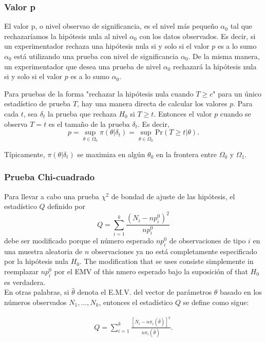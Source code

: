 \documentclass{book}
\begin{document}
\subsubsection{Valor p}
El valor p, o nivel observao de significancia, es el nivel más pequeño $\alpha_0$ tal que rechazaríamos la hipótesis nula al nivel $\alpha_0$ con los datos observados. Es decir, si un experimentador rechaza una hipótesis nula si y solo si el valor $p$ es a lo sumo $\alpha_0$ está utilizando una prueba con nivel de significancia $\alpha_0$. De la misma manera, un experimentador que desea una prueba de nivel $\alpha_0$ rechazará la hipótesis nula si y solo si el valor $p$ es a lo sumo $\alpha_0$.

Para pruebas de la forma "rechazar la hipótesis nula cuando $T \geq c$" para un único estadístico de prueba $T$, hay una manera directa de calcular los valores $p$. 
Para cada $t$, sea $\delta_t$ la prueba que rechaza $H_0$ si $T \geq t$. Entonces el valor $p$ cuando se observa $T = t$ es el tamaño de la prueba $\delta_t$.
Es decir,
\begin{equation}
p = \sup_{\theta \in \Omega_0} \pi(\theta|\delta_t) = \sup_{\theta \in \Omega_0} \text{Pr}(T \geq t|\theta).
\end{equation}

Típicamente, $\pi(\theta|\delta_t)$ se maximiza en algún $\theta_0$ en la frontera entre $\Omega_0$ y $\Omega_1$.


\subsubsection{Prueba Chi-cuadrado}
Para llevar a cabo una prueba $\chi^2$ de bondad de ajuste de las hipótesis, el estadístico $Q$ definido por 
$$Q = \sum_{i=1}^{k} \frac{(N_i - np_i^0)^2}{np_i^0}$$
debe ser modificado porque el número esperado $np_i^0$ de observaciones de tipo $i$ en una muestra aleatoria de $n$ observaciones ya no está completamente especificado por la hipótesis nula $H_0$. The modification that se uses consiste simplemente in reemplazar $np_i^0$ por el EMV of this nmero esperado bajo la suposición of that $H_0$ es verdadera.\\
En otras palabras, si $\hat{\theta}$ denota el E.M.V. del vector de parámetros $\theta$ basado en los números observados $N_1, \ldots, N_k$, entonces el estadístico $Q$ se define como sigue:

\begin{align} \label{Q_chi_test}
Q = \sum_{i=1}^{k} \frac{[N_i - n\pi_i(\hat{\theta})]^2}{n\pi_i(\hat{\theta})}.
\end{align}
\end{document}
